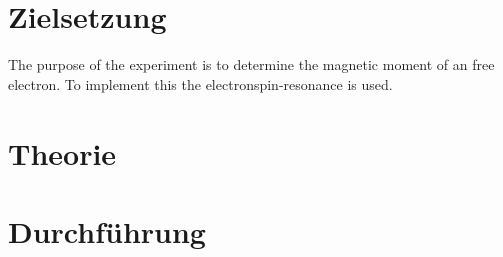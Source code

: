 \section{Zielsetzung}

The purpose of the experiment is to determine the magnetic moment of an free electron.
To implement this the electronspin-resonance is used.


\section{Theorie}



\section{Durchführung}
